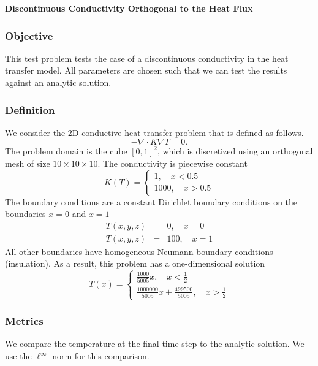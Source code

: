 \documentclass[12pt]{article}
\begin{document}
\begin{center}
{\large {\bf Discontinuous Conductivity Orthogonal to the Heat Flux}}
\end{center}

\subsubsection*{Objective}


This test problem tests the case of a discontinuous conductivity in
the heat transfer model. All parameters are chosen such that we can
test the results against an analytic solution.

\subsubsection*{Definition}

We consider the 2D conductive heat transfer problem that is defined as
follows.
$$
-\nabla\cdot K\nabla T = 0.
$$
The problem domain is the cube $[0,1]^2$, which is
discretized using an orthogonal mesh of size $10 \times
10 \times 10$. The conductivity is piecewise constant
$$
K(T) = \left\{\begin{array}{l}
              1,\quad x<0.5 \\
              1000,\quad x>0.5
             \end{array}
             \right.
$$
The boundary conditions are a constant Dirichlet boundary conditions
on the boundaries $x=0$ and $x=1$ 
\begin{eqnarray*}
T(x,y,z) &=& 0,\quad x=0 \\
T(x,y,z) &=& 100,\quad x=1 
\end{eqnarray*} 
All other boundaries have homogeneous Neumann boundary conditions
(insulation). As a result, this problem has a one-dimensional solution 
$$
T(x) = \left\{
\begin{array}{l}
\frac{1000}{5005}x,\quad x<\frac{1}{2} \\
\frac{1000000}{5005} x + \frac{499500}{5005},\quad x>\frac{1}{2}
\end{array}
\right.
$$


\subsubsection*{Metrics}

We compare the temperature at the final time step to the
analytic solution. We use the $\ell^\infty$-norm for this comparison. 
\end{document}
